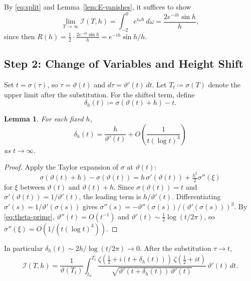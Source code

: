 \documentclass{amsart}
\newtheorem{lemma}[theorem]{Lemma}
\newcommand{\assign}{\coloneqq}
\begin{document}
By \eqref{eq:split} and Lemma~\ref{lem:E-vanishes}, it suffices to show
\begin{equation}\label{eq:suffices}
  \lim_{T\to\infty}\mathcal{I}(T,h) = \int_{-2}^0 e^{i\omega h}\,d\omega
  = \frac{2e^{-ih}\sin h}{h},
\end{equation}
since then $R(h) = \tfrac{1}{2}\cdot\tfrac{2e^{-ih}\sin h}{h} = e^{-ih}\sin h/h$.

\subsection*{Step 2: Change of Variables and Height Shift}

Set $t = \sigma(\tau)$, so $\tau = \vartheta(t)$ and $d\tau = \vartheta'(t)\,dt$.
Let $T_t \assign \sigma(T)$ denote the upper limit after the substitution.
For the shifted term, define
\begin{equation}\label{eq:delta-def}
  \delta_h(t) \assign \sigma(\vartheta(t)+h) - t.
\end{equation}

\begin{lemma}\label{lem:delta}
For each fixed $h$,
\[
  \delta_h(t) = \frac{h}{\vartheta'(t)} + O\!\left(\frac{1}{t(\log t)^3}\right)
\]
as $t\to\infty$.
\end{lemma}
\begin{proof}
Apply the Taylor expansion of $\sigma$ at $\vartheta(t)$:
\[
  \sigma(\vartheta(t)+h) - \sigma(\vartheta(t))
  = h\,\sigma'(\vartheta(t)) + \tfrac{h^2}{2}\sigma''(\xi)
\]
for $\xi$ between $\vartheta(t)$ and $\vartheta(t)+h$. Since $\sigma(\vartheta(t))=t$
and $\sigma'(\vartheta(t)) = 1/\vartheta'(t)$, the leading term is $h/\vartheta'(t)$.
Differentiating $\sigma'(s) = 1/\vartheta'(\sigma(s))$ gives
$\sigma''(s) = -\vartheta''(\sigma(s))/(\vartheta'(\sigma(s)))^3$.
By \eqref{eq:theta-prime}, $\vartheta''(t) = O(t^{-1})$ and $\vartheta'(t)
\sim \tfrac{1}{2}\log(t/2\pi)$, so $\sigma''(\xi) = O(1/(t(\log t)^3))$.
\end{proof}

In particular $\delta_h(t) \sim 2h/\log(t/2\pi) \to 0$. After the substitution $\tau\to t$,
\begin{equation}\label{eq:I-height}
  \mathcal{I}(T,h) = \frac{1}{\vartheta(T_t)}\int_{t_0}^{T_t}
  \frac{\zeta(\tfrac{1}{2}+i(t+\delta_h(t)))\,\overline{\zeta(\tfrac{1}{2}+it)}}
       {\sqrt{\vartheta'(t+\delta_h(t))\,\vartheta'(t)}}\,\vartheta'(t)\,dt.
\end{equation}
\end{document}
